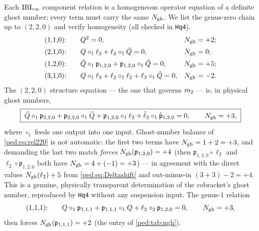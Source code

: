 Each $\mathrm{IBL}_\infty$ component relation is a homogeneous operator equation of a definite ghost number;
every term must carry the same $N_{\text{gh}}$. We list the genus-zero chain up to $(2,2,0)$ and
verify homogeneity (all checked in \texttt{Hq4}).
\begin{subequations}
	\label{ped:eq:rels}
	\begin{align}
		\label{ped:eq:rel110}
		\text{(1,1,0):}\qquad
		&
		Q^2=0,
		&&N_{\text{gh}}=+2;
		\\
		\label{ped:eq:rel210}
		\text{(2,1,0):}\qquad
		&
		Q\circ_1\ell_2+\ell_2\circ_1\hat Q=0,
		&&N_{\text{gh}}=0;
		\\
		\label{ped:eq:rel120}
		\text{(1,2,0):}\qquad
		&
		\hat Q\circ_1\mathfrak p_{1,2,0}+\mathfrak p_{1,2,0}\circ_1\hat Q=0,
		&&N_{\text{gh}}=+5;
		\\
		\label{ped:eq:rel310}
		\text{(3,1,0):}\qquad
		&
		Q\circ_1\ell_3+\ell_2\circ_1\ell_2+\ell_3\circ_1\hat Q=0,
		&&N_{\text{gh}}=-2.
	\end{align}
\end{subequations}
The $(2,2,0)$ structure equation --- the one that governs $m_2$ --- is, in physical ghost
numbers,
\begin{equation}
	\boxed{\;
	\hat Q\circ_1\mathfrak p_{2,2,0}
	+\mathfrak p_{2,2,0}\circ_1\hat Q
	+\mathfrak p_{1,2,0}\circ_1\ell_2
	+\hat\ell_2\circ_1\hat{\mathfrak p}_{1,2,0}=0,
	\qquad N_{\text{gh}}=+3,
	\;}
	\label{ped:eq:rel220}
\end{equation}
where $\circ_1$ feeds one output into one input. Ghost-number balance of \eqref{ped:eq:rel220}
is not automatic: the first two terms have $N_{\text{gh}}=1+2=+3$, and demanding the last two match
\emph{forces} $N_{\text{gh}}(\mathfrak p_{1,2,0})=+4$ (then $\mathfrak p_{1,2,0}\circ\ell_2$ and
$\ell_2\circ\mathfrak p_{1,2,0}$ both have $N_{\text{gh}}=4+(-1)=+3$) --- in agreement with the
direct values $N_{\text{gh}}(\ell_2)+5$ from \eqref{ped:eq:Deltashift} and out-minus-in
$(3+3)-2=+4$. This is a genuine, physically
transparent determination of the cobracket's ghost number, reproduced by \texttt{Hq4}
without any suspension input. The genus-1 relation
\begin{equation}
	\text{(1,1,1):}\qquad
	Q\circ_1\mathfrak p_{1,1,1}+\mathfrak p_{1,1,1}\circ_1 Q
	+\ell_2\circ_2\mathfrak p_{1,2,0}=0,
	\qquad N_{\text{gh}}=+3,
	\label{ped:eq:rel111}
\end{equation}
then forces $N_{\text{gh}}(\mathfrak p_{1,1,1})=+2$ (the entry of \cref{ped:tab:ngh}).

